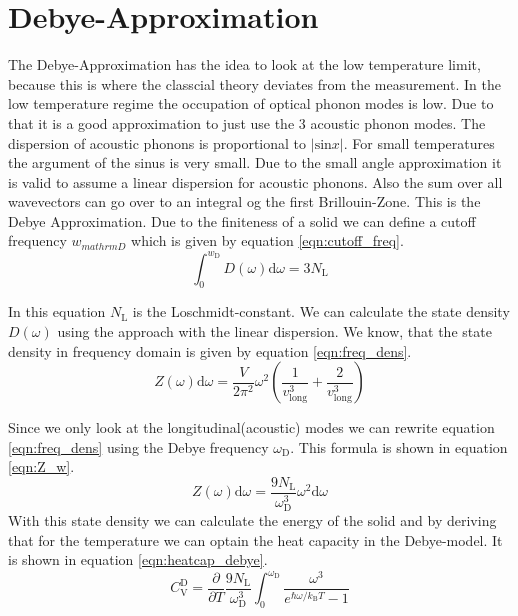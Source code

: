 \section{Debye-Approximation}
\label{sec:debye}
The Debye-Approximation has the idea to look at the low temperature limit, because this is where the classcial theory deviates from the measurement. In the low temperature regime the 
occupation of optical phonon modes is low. Due to that it is a good approximation to just use the $3$ acoustic phonon modes. The dispersion of acoustic phonons is proportional to  
$\lvert\text{sin}x\rvert$. For small temperatures the argument of the sinus is very small. Due to the small angle approximation it is valid to assume a linear dispersion for acoustic
phonons. Also the sum over all wavevectors can go over to an integral og the first Brillouin-Zone. This is the Debye Approximation. Due to the finiteness of a solid we can define
a cutoff frequency $w_{mathrm{D}}$ which is given by equation \ref{eqn:cutoff_freq}.
\begin{equation}
    \label{eqn:cutoff_freq}
    \int_0^{w_{\mathrm{D}}}D(\omega)\mathrm{d}\omega = 3N_\mathrm{L}
\end{equation}

In this equation $N_\mathrm{L}$ is the Loschmidt-constant. We can calculate the state density $D(\omega)$ using the approach with the linear dispersion. We know, that the state 
density in frequency domain is given by equation \ref{eqn:freq_dens}.
\begin{equation}
    \label{eqn:freq_dens}
    Z(\omega)\mathrm{d}\omega = \frac{V}{2\pi^2}\omega^2\left(\frac{1}{v_{\text{long}}^3}+\frac{2}{v_{\text{long}}^3}\right)
\end{equation} 

Since we only look at the longitudinal(acoustic) modes we can rewrite equation \ref{eqn:freq_dens} using the Debye frequency $\omega_\mathrm{D}$. This formula is shown in equation \ref{eqn:Z_w}.
\begin{equation}
    \label{eqn:Z_w}
    Z(\omega)\mathrm{d}\omega = \frac{9N_\mathrm{L}}{\omega_{\mathrm{D}}^3}\omega^2\mathrm{d}\omega
\end{equation}
With this state density we can calculate the energy of the solid and by deriving that for the temperature we can optain the heat capacity in the Debye-model. It is shown in equation 
\ref{eqn:heatcap_debye}.
\begin{equation}
    \label{eqn:heatcap_debye}
    C_{\mathrm{V}}^{\mathrm{D}} = \frac{\partial}{\partial T}\frac{9N_\mathrm{L}}{\omega_{\mathrm{D}}^3} \int_0^{\omega_{\mathrm{D}}}\frac{\omega^3}{e^{\hbar\omega/k_\mathrm{B}T}-1}
\end{equation}

